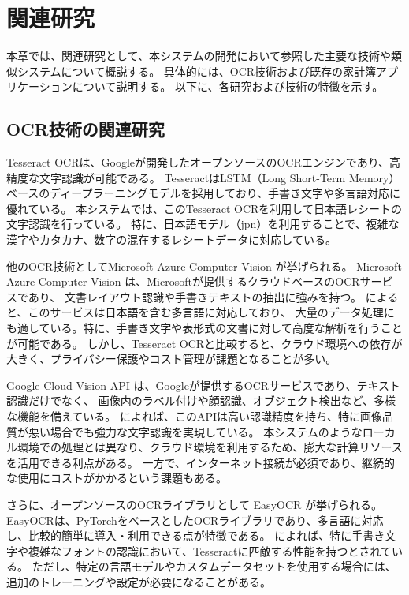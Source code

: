 \documentclass[main]{subfiles}
\begin{document}
\chapter{関連研究}
\label{cha:related}

本章では、関連研究として、本システムの開発において参照した主要な技術や類似システムについて概説する。
具体的には、OCR技術および既存の家計簿アプリケーションについて説明する。
以下に、各研究および技術の特徴を示す。

\section{OCR技術の関連研究}

Tesseract OCR\cite{Tesseract}は、Googleが開発したオープンソースのOCRエンジンであり、高精度な文字認識が可能である。
TesseractはLSTM（Long Short-Term Memory）ベースのディープラーニングモデルを採用しており、手書き文字や多言語対応に優れている。
本システムでは、このTesseract OCRを利用して日本語レシートの文字認識を行っている。
特に、日本語モデル（jpn）を利用することで、複雑な漢字やカタカナ、数字の混在するレシートデータに対応している。

他のOCR技術としてMicrosoft Azure Computer Vision が挙げられる。
Microsoft Azure Computer Vision は、Microsoftが提供するクラウドベースのOCRサービスであり、
文書レイアウト認識や手書きテキストの抽出に強みを持つ。\cite{AzureOCR} によると、このサービスは日本語を含む多言語に対応しており、
大量のデータ処理にも適している。特に、手書き文字や表形式の文書に対して高度な解析を行うことが可能である。
しかし、Tesseract OCRと比較すると、クラウド環境への依存が大きく、プライバシー保護やコスト管理が課題となることが多い。

Google Cloud Vision API は、Googleが提供するOCRサービスであり、テキスト認識だけでなく、
画像内のラベル付けや顔認識、オブジェクト検出など、多様な機能を備えている。
\cite{GoogleVision} によれば、このAPIは高い認識精度を持ち、特に画像品質が悪い場合でも強力な文字認識を実現している。
本システムのようなローカル環境での処理とは異なり、クラウド環境を利用するため、膨大な計算リソースを活用できる利点がある。
一方で、インターネット接続が必須であり、継続的な使用にコストがかかるという課題もある。

さらに、オープンソースのOCRライブラリとして EasyOCR が挙げられる。
EasyOCRは、PyTorchをベースとしたOCRライブラリであり、多言語に対応し、比較的簡単に導入・利用できる点が特徴である。
\cite{EasyOCR} によれば、特に手書き文字や複雑なフォントの認識において、Tesseractに匹敵する性能を持つとされている。
ただし、特定の言語モデルやカスタムデータセットを使用する場合には、追加のトレーニングや設定が必要になることがある。
\end{document}
